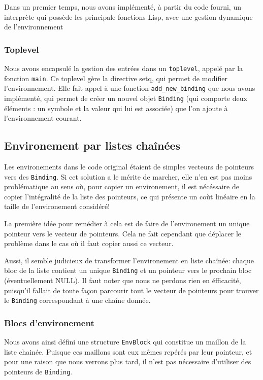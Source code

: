\documentclass[a4paper,11pt]{article}
\begin{document}
Dans un premier temps, nous avons implémenté, à partir du code fourni, un interprète qui possède les principale fonctions Lisp, avec une gestion dynamique de l'environnement

\subsubsection{Toplevel}

  Nous avons encapsulé la gestion des entrées dans un \texttt{toplevel}, 
 appelé par la fonction \texttt{main}. Ce toplevel gère la directive setq, qui
 permet de modifier l'environnement. 
 Elle fait appel à une fonction \texttt{add\_new\_binding} que nous avons
 implémenté, qui permet de créer un nouvel objet
  \texttt{Binding} (qui comporte deux éléments : un
 symbole et la valeur qui lui est associée) que l'on ajoute à l'environnement courant.

\subsection{Environement par listes chaînées}

Les environements dans le code original étaient de simples vecteurs de pointeurs
vers des \texttt{Binding}. Si cet solution a le mérite de marcher, elle n'en est
pas moins problématique au sens où, pour copier un environement, il est
nécéssaire de copier l'intégralité de la liste des pointeurs, ce qui présente un
coùt linéaire en la taille de l'environement considéré!

La première idée pour remédier à cela est de faire de l'environement un unique
pointeur vers le vecteur de pointeurs. Cela ne fait cependant que déplacer le
problème dans le cas où il faut copier aussi ce vecteur.

Aussi, il semble judicieux de transformer l'environement en liste chaînée:
chaque bloc de la liste contient un unique \texttt{Binding} et un pointeur vers
le prochain bloc (éventuellement NULL). Il faut noter que nous ne perdons rien
en éfficacité, puisqu'il fallait de toute façon parcourir tout le vecteur de
pointeurs pour trouver le \texttt{Binding} correspondant à une chaîne donnée.

\subsubsection{Blocs d'environement}

Nous avons ainsi défini une structure \texttt{EnvBlock} qui constitue un maillon
de la liste chainée. Puisque ces maillons sont eux mêmes repérés par leur
pointeur, et pour une raison que nous verrons plus tard, il n'est pas nécessaire
d'utiliser des pointeurs de \texttt{Binding}.
\end{document}
